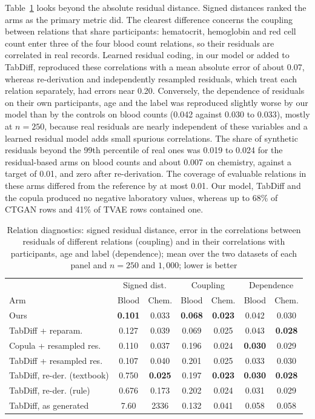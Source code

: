 \documentclass[conference]{IEEEtran}
\begin{document}
Table~\ref{tab:diagnostics} looks beyond the absolute residual distance. Signed distances ranked the arms as the primary metric did. The clearest difference concerns the coupling between relations that share participants: hematocrit, hemoglobin and red cell count enter three of the four blood count relations, so their residuals are correlated in real records. Learned residual coding, in our model or added to TabDiff, reproduced these correlations with a mean absolute error of about 0.07, whereas re-derivation and independently resampled residuals, which treat each relation separately, had errors near 0.20. Conversely, the dependence of residuals on their own participants, age and the label was reproduced slightly worse by our model than by the controls on blood counts (0.042 against 0.030 to 0.033), mostly at $n = 250$, because real residuals are nearly independent of these variables and a learned residual model adds small spurious correlations. The share of synthetic residuals beyond the 99th percentile of real ones was 0.019 to 0.024 for the residual-based arms on blood counts and about 0.007 on chemistry, against a target of 0.01, and zero after re-derivation. The coverage of evaluable relations in these arms differed from the reference by at most 0.01. Our model, TabDiff and the copula produced no negative laboratory values, whereas up to 68\% of CTGAN rows and 41\% of TVAE rows contained one.

\begin{table}[t]
\caption{Relation diagnostics: signed residual distance, error in the correlations between residuals of different relations (coupling) and in their correlations with participants, age and label (dependence); mean over the two datasets of each panel and $n = 250$ and $1{,}000$; lower is better}
\label{tab:diagnostics}
\centering
\setlength{\tabcolsep}{2.2pt}
\begin{tabular}{lcccccc}
\toprule
& \multicolumn{2}{c}{Signed dist.} & \multicolumn{2}{c}{Coupling} & \multicolumn{2}{c}{Dependence} \\
Arm & Blood & Chem. & Blood & Chem. & Blood & Chem. \\
\midrule
Ours & \textbf{0.101} & 0.033 & \textbf{0.068} & \textbf{0.023} & 0.042 & 0.030 \\
TabDiff + reparam. & 0.127 & 0.039 & 0.069 & 0.025 & 0.043 & \textbf{0.028} \\
Copula + resampled res. & 0.110 & 0.037 & 0.196 & 0.024 & \textbf{0.030} & 0.029 \\
TabDiff + resampled res. & 0.107 & 0.040 & 0.201 & 0.025 & 0.033 & 0.030 \\
TabDiff, re-der. (textbook) & 0.750 & \textbf{0.025} & 0.197 & \textbf{0.023} & \textbf{0.030} & \textbf{0.028} \\
TabDiff, re-der. (rule) & 0.676 & 0.173 & 0.202 & 0.024 & 0.031 & 0.029 \\
TabDiff, as generated & 7.60 & 2336 & 0.132 & 0.041 & 0.058 & 0.058 \\
\bottomrule
\end{tabular}
\end{table}
\end{document}
